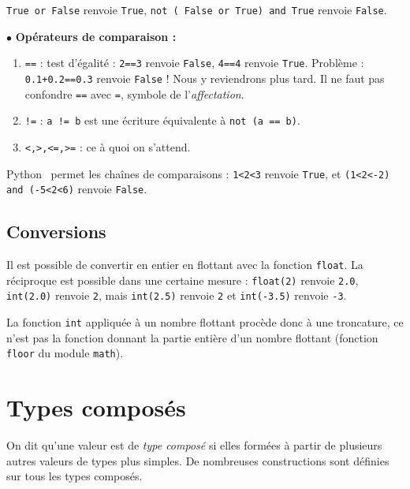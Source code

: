 \begin{exemple}
\texttt{True or False} renvoie \texttt{True}, \texttt{not ( False or 
True) and True} renvoie \texttt{False}.
\end{exemple}

\noindent$\bullet$ \textbf{Opérateurs de comparaison :}
\begin{enumerate}
 \item \texttt{==} : test d'égalité : \texttt{2==3} renvoie \texttt{False}, \texttt{4==4} renvoie 
\texttt{True}. Problème : \texttt{0.1+0.2==0.3} renvoie \texttt{False} ! Nous y reviendrons plus 
tard. Il ne faut pas confondre \texttt{==} avec \texttt{=}, symbole de l'\emph{affectation}.
 \item \texttt{!=} : \texttt{a != b} est une écriture équivalente à \texttt{not (a == b)}.
 \item \texttt{<,>,<=,>=} : ce à quoi on s'attend.
\end{enumerate}


\begin{rem}
Python \ permet les chaînes de comparaisons : \texttt{1<2<3} renvoie
\texttt{True}, et \texttt{(1<2<-2) and (-5<2<6)} renvoie \texttt{False}.
\end{rem}

\subsection{Conversions}

Il est possible de convertir en entier en flottant avec la fonction \texttt{float}. La réciproque est possible dans une certaine 
mesure : \texttt{float(2)} renvoie \texttt{2.0}, \texttt{int(2.0)} renvoie \texttt{2}, mais \texttt{int(2.5)} renvoie \texttt{2} et 
\texttt{int(-3.5)} renvoie \texttt{-3}.

La fonction \texttt{int} appliquée à un nombre flottant procède donc à une troncature, ce n'est pas la fonction donnant la partie entière d'un nombre flottant (fonction \texttt{floor} du module \texttt{math}).

\section{Types composés}

On dit qu'une valeur est de \emph{type composé} si elles formées à partir de plusieurs autres 
valeurs de types plus simples. De nombreuses constructions sont définies sur tous les types 
composés.\\

